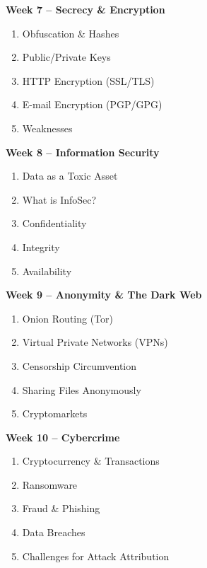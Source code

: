 \documentclass[11pt, a4paper]{article}
\begin{document}
\vspace*{.1in}
\noindent\textbf{Week 7 -- Secrecy \& Encryption}
\begin{enumerate}
\item Obfuscation \& Hashes
\item Public/Private Keys
\item HTTP Encryption (SSL/TLS)
\item E-mail Encryption (PGP/GPG)
\item Weaknesses
\end{enumerate}

\vspace*{.1in}
\noindent\textbf{Week 8 -- Information Security}
\begin{enumerate}
\item Data as a Toxic Asset %
\item What is InfoSec?
\item Confidentiality
\item Integrity
\item Availability
\end{enumerate}

\vspace*{.1in}
\noindent\textbf{Week 9 -- Anonymity \& The Dark Web}
\begin{enumerate}
\item Onion Routing (Tor)
\item Virtual Private Networks (VPNs)
\item Censorship Circumvention
\item Sharing Files Anonymously
\item Cryptomarkets
\end{enumerate}

\vspace*{.1in}
\noindent\textbf{Week 10 -- Cybercrime}
\begin{enumerate}
\item Cryptocurrency \& Transactions %
\item Ransomware
\item Fraud \& Phishing
\item Data Breaches
\item Challenges for Attack Attribution
\end{enumerate}
\end{document}
